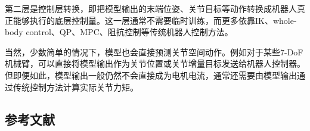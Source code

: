 第二层是控制层转换，即把模型输出的末端位姿、关节目标等动作转换成机器人真正能够执行的底层控制量。这一层通常不需要临时训练，而更多依靠IK、whole-body control、QP、MPC、阻抗控制等传统机器人控制方法。

当然，少数简单的情况下，模型也会直接预测关节空间动作。例如对于某些7-DoF机械臂，可以直接将模型输出作为关节位置或关节增量目标发送给机器人控制器。但即便如此，模型输出一般仍然不会直接成为电机电流，通常还需要由模型输出通过传统控制方法计算实际关节力矩。

\hypertarget{ux53c2ux8003ux6587ux732e-150}{%
\subsection{参考文献}\label{ux53c2ux8003ux6587ux732e-150}}

\vspace{0.25em}
